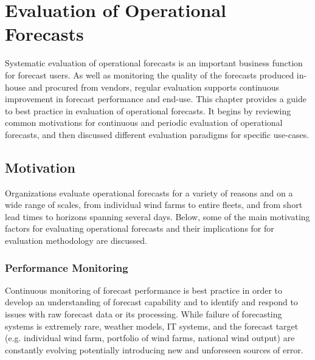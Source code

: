 \chapter{Evaluation of Operational Forecasts}\label{ch:eval_of_oper}


Systematic evaluation of operational forecasts is an important business function for forecast users. As well as monitoring the quality of the forecasts produced in-house and procured from vendors, regular evaluation supports continuous improvement in forecast performance and end-use. This chapter provides a guide to best practice in evaluation of operational forecasts. It begins by reviewing common motivations for continuous and periodic evaluation of operational forecasts, and then discussed different evaluation paradigms for specific use-cases.

\section{Motivation} 

Organizations evaluate operational forecasts for a variety of reasons and on a wide range of scales, from individual wind farms to entire fleets, and from short lead times to horizons spanning several days. Below, some of the main motivating factors for evaluating operational forecasts and their implications for for evaluation methodology are discussed.

\subsection{Performance Monitoring}

Continuous monitoring of forecast performance is best practice in order to develop an understanding of forecast capability and to identify and respond to issues with raw forecast data or its processing. While failure of forecasting systems is extremely rare, weather models, IT systems, and the forecast target (e.g. individual wind farm, portfolio of wind farms, national wind output) are constantly evolving potentially introducing new and unforeseen sources of error.


